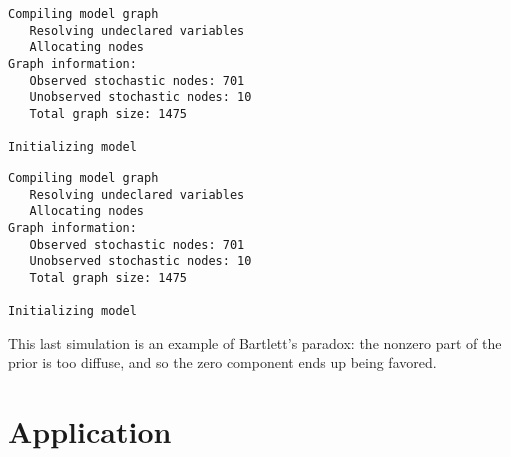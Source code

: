\documentclass[12pt,twoside]{dukestatscithesis}
\theoremstyle{definition}
\theoremstyle{definition}
\theoremstyle{definition}
\theoremstyle{remark}
\begin{document}
\begin{verbatim}
Compiling model graph
   Resolving undeclared variables
   Allocating nodes
Graph information:
   Observed stochastic nodes: 701
   Unobserved stochastic nodes: 10
   Total graph size: 1475

Initializing model
\end{verbatim}
\begin{Shaded}
\begin{Highlighting}[]
\end{Highlighting}
\end{Shaded}
\begin{Shaded}
\begin{Highlighting}[]
\StringTok{ }\NormalTok{(}
                    \NormalTok{, }\NormalTok{(}\NormalTok{, }\NormalTok{, }\NormalTok{,}\NormalTok{,}\NormalTok{),}
                    \NormalTok{)}
\end{Highlighting}
\end{Shaded}
\begin{verbatim}
Compiling model graph
   Resolving undeclared variables
   Allocating nodes
Graph information:
   Observed stochastic nodes: 701
   Unobserved stochastic nodes: 10
   Total graph size: 1475

Initializing model
\end{verbatim}
\begin{Shaded}
\begin{Highlighting}[]
\end{Highlighting}
\end{Shaded}
This last simulation is an example of Bartlett's paradox: the nonzero
part of the prior is too diffuse, and so the zero component ends up
being favored.

\chapter{Application}\label{application}
\begin{Shaded}
\begin{Highlighting}[]
\OperatorTok{::}\OperatorTok{$}\NormalTok{(} \NormalTok{)}
\OperatorTok{::}\OperatorTok{$}\NormalTok{(} \NormalTok{)}

\NormalTok{(}\NormalTok{)}
\end{Highlighting}
\end{Shaded}
\end{document}
